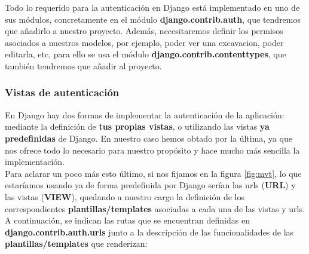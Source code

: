 Todo lo requerido para la autenticación en Django está implementado en uno de sus módulos,
concretamente en el módulo \textbf{django.contrib.auth}, que tendremos que añadirlo a
nuestro proyecto. Además, necesitaremos definir los permisos asociados a nuestros modelos,
por ejemplo, poder ver una excavacion, poder editarla, etc, para ello se usa el módulo
\textbf{django.contrib.contenttypes}, que también tendremos que añadir al proyecto.

\subsubsection{Vistas de autenticación}
En Django hay dos formas de implementar la autenticación de la aplicación: mediante la
definición de \textbf{tus propias vistas}, o utilizando las vistas \textbf{ya predefinidas}
de Django. En nuestro caso hemos obtado por la última, ya que nos ofrece todo lo necesario
para nuestro propósito y hace mucho más sencilla la implementación.\\

Para aclarar un poco más esto último, si nos fijamos en la figura \ref{fig:mvt}, lo que
estaríamos usando ya de forma predefinida por Django serían las urls (\textbf{URL}) y las
vistas (\textbf{VIEW}), quedando a nuestro cargo la definición de los correspondientes
\textbf{plantillas/templates} asociadas a cada una de las vistas y urls.\\

A continuación, se indican las rutas que se encuentran definidas en
\textbf{django.contrib.auth.urls} junto a la descripción de las funcionalidades de las
\textbf{plantillas/templates} que renderizan:

